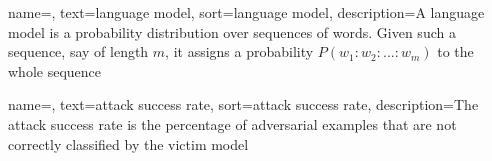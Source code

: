 {
    name=,
    text=language model,
    sort=language model,
    description={A language model is a probability distribution over sequences of words. Given such a sequence, say of length $m$, it assigns a probability $P(w_1:w_2:...:w_m)$ to the whole sequence}
}

{
    name=,
    text=attack success rate,
    sort=attack success rate,
    description={The attack success rate is the percentage of adversarial examples that are not correctly classified by the victim model}
}




